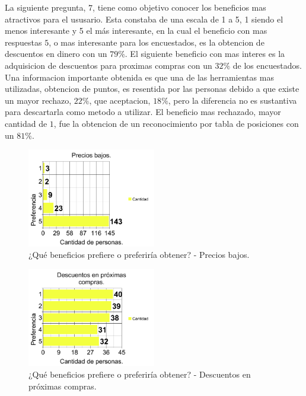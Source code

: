 La siguiente pregunta, $7$, tiene como objetivo conocer los beneficios mas atractivos para el ususario.
Esta constaba de una escala de 1 a 5, 1 siendo el menos interesante y 5 el más interesante, en la cual
el beneficio con mas respuestas $5$, o mas interesante para los encuestados, es la obtencion de
descuentos en dinero con un $79\%$. El siguiente beneficio con mas interes es la adquisicion de descuentos
para proximas compras con un $32\%$ de los encuestados. Una informacion importante obtenida es que
una de las herramientas mas utilizadas, obtencion de puntos, es resentida por las personas debido a
que existe un mayor rechazo, $22\%$, que aceptacion, $18\%$, pero la diferencia no es sustantiva para
descartarla como metodo a utilizar. El beneficio mas rechazado, mayor cantidad de $1$, fue la
obtencion de un reconocimiento por tabla de posiciones con un $81\%$.

\begin{figure}[!htb]
  \centering
  \includegraphics[width=0.5\textwidth]{images/chartPreg7_1.png}
  \caption[chart7-1]{¿Qué beneficios prefiere o preferiría obtener? - Precios bajos.}
  \label{fig:chart2}
\end{figure}

\begin{figure}[!htb]
  \centering
  \includegraphics[width=0.5\textwidth]{images/chartPreg7_2.png}
  \caption[chart7-2]{¿Qué beneficios prefiere o preferiría obtener? - Descuentos en próximas compras.}
  \label{fig:chart2}
\end{figure}

